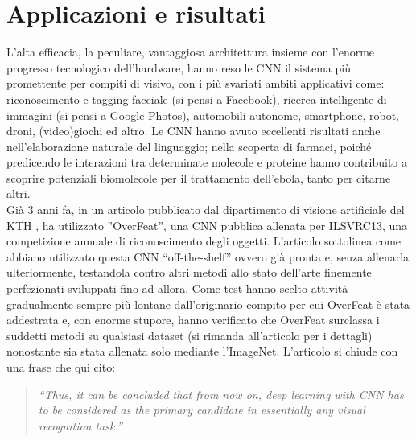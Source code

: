 \section{Applicazioni e risultati}
L'alta efficacia, la peculiare, vantaggiosa architettura insieme con l'enorme progresso tecnologico dell'hardware, hanno reso le CNN il sistema più promettente per compiti di visivo, con i più svariati ambiti applicativi come: riconoscimento e tagging facciale (si pensi a Facebook), ricerca intelligente di immagini (si pensi a Google Photos), automobili autonome, smartphone, robot, droni, (video)giochi ed altro. Le CNN hanno avuto eccellenti risultati anche nell'elaborazione naturale del linguaggio; nella scoperta di farmaci, poiché predicendo le interazioni tra determinate molecole e proteine hanno contribuito a scoprire potenziali biomolecole per il trattamento dell'ebola\parencite{WCNN}, tanto per citarne altri.\\
Già 3 anni fa, in un articolo pubblicato dal dipartimento di visione artificiale del KTH \parencite{Overfeat}, ha utilizzato ”OverFeat”, una CNN pubblica allenata per ILSVRC13, una competizione annuale di riconoscimento degli oggetti. L'articolo sottolinea come abbiano utilizzato questa CNN “off-the-shelf” ovvero già pronta e, senza allenarla ulteriormente, testandola contro altri metodi allo stato dell'arte finemente perfezionati sviluppati fino ad allora. Come test hanno scelto attività gradualmente sempre più lontane dall'originario compito per cui OverFeat è stata addestrata e, con enorme stupore, hanno verificato che OverFeat surclassa i suddetti metodi su qualsiasi dataset (si rimanda all'articolo per i dettagli) nonostante sia stata allenata solo mediante l'ImageNet. L'articolo si chiude con una frase che qui cito:
\begin{quote}
\emph{“Thus, it can be concluded that from now on, deep learning with CNN has to be considered as the primary candidate in essentially any visual recognition task.”}
\end{quote}\\
